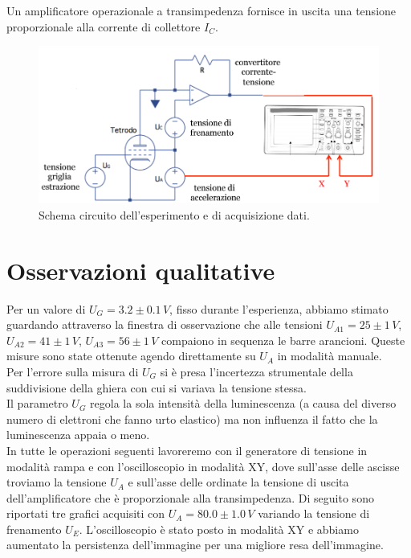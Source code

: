 \documentclass[10pt,a4paper]{article}
\begin{document}
Un amplificatore operazionale a transimpedenza fornisce in uscita una tensione proporzionale alla corrente di collettore $I_C$.\\

\begin{figure}[!htb]
  \centering
  \includegraphics[scale=.5]{circuito.png}
\caption{Schema circuito dell'esperimento e di acquisizione dati.}
\label{circuito}
\end{figure}


\section{Osservazioni qualitative}

Per un valore di $U_G = 3.2 \pm 0.1 \, V $, fisso durante l'esperienza, abbiamo stimato guardando attraverso la finestra di osservazione che alle tensioni $U_{A1} = 25 \pm 1 \, V$, $U_{A2} = 41 \pm 1 \, V$, $U_{A3} = 56 \pm 1 \, V$ compaiono in sequenza le barre arancioni. Queste misure sono state ottenute agendo direttamente su $U_A$ in modalità manuale.\\
Per l'errore sulla misura di $U_G$ si è presa l'incertezza strumentale della suddivisione della ghiera con cui si variava la tensione stessa.\\
Il parametro $U_G$ regola la sola intensità della luminescenza (a causa del diverso numero di elettroni che fanno urto elastico) ma non influenza il fatto che la luminescenza appaia o meno.\\
In tutte le operazioni seguenti lavoreremo con il generatore di tensione in modalità rampa e con l'oscilloscopio in modalità XY, dove sull'asse delle ascisse troviamo la tensione $U_A$ e sull'asse delle ordinate la tensione di uscita dell'amplificatore che è proporzionale alla transimpedenza. 
Di seguito sono riportati tre grafici acquisiti con $U_A = 80.0\pm1.0 \, V$ variando la tensione di frenamento $U_E$. L'oscilloscopio è stato posto in modalità XY e abbiamo aumentato la persistenza dell'immagine per una migliore resa dell'immagine.\\
\end{document}
